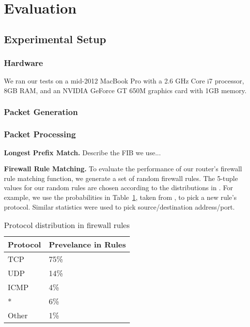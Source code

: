 \section{Evaluation}
\label{sec:eval}

\subsection{Experimental Setup}

\subsubsection{Hardware}

We ran our tests on a mid-2012 MacBook Pro with a 2.6 GHz Core i7 processor,
8GB RAM, and an NVIDIA GeForce GT 650M graphics card with 1GB memory.

\subsubsection{Packet Generation}

\subsubsection{Packet Processing}
\label{sec:eval-proc}

\noindent \textbf{Longest Prefix Match.} Describe the FIB we use...\\

\noindent \textbf{Firewall Rule Matching.} To evaluate the performance of our
router's firewall rule matching function, we generate a set of random firewall
rules. The 5-tuple values for our random rules are chosen according to the
distributions in \cite{Rovniagin}. For example, we use the probabilities in
Table~\ref{tab:proto-dist}, taken from \cite{Rovniagin}, to pick a new rule's
protocol. Similar statistics were used to pick source/destination address/port.

\begin{table}[htbp]
   \centering
   \begin{tabular}{ l l } 
      \toprule
      \textbf{Protocol}  & \textbf{Prevelance in Rules} \\
      \midrule
	  TCP & 75\% \\
      UDP & 14\% \\
	  ICMP & 4\% \\
	  * & 6\% \\
	  Other & 1\% \\
      \bottomrule
   \end{tabular}
   \caption{Protocol distribution in firewall rules}
   \label{tab:proto-dist}
\end{table}

